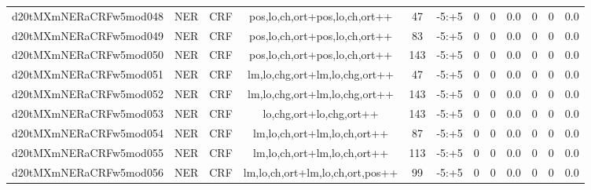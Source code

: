 \documentclass[a4paper]{article}
\begin{document}
\begin{landscape}
\begin{center}
\begin{tabular}{ |c|c|c|c|c|c|c|c|c|c|c|c|}
 
 	
 	\small{ d20tMXmNERaCRFw5mod048 } & \small{ NER} & \small{  CRF }  & pos,lo,ch,ort+pos,lo,ch,ort++  &  47 &  \small{  -5:+5 }  &  0 & 0 & 0.0  &  0 & 0 & 0.0 \\
 	

 
 	
 	\small{ d20tMXmNERaCRFw5mod049 } & \small{ NER} & \small{  CRF }  & pos,lo,ch,ort+pos,lo,ch,ort++  &  83 &  \small{  -5:+5 }  &  0 & 0 & 0.0  &  0 & 0 & 0.0 \\
 	

 
 	
 	\small{ d20tMXmNERaCRFw5mod050 } & \small{ NER} & \small{  CRF }  & pos,lo,ch,ort+pos,lo,ch,ort++  &  143 &  \small{  -5:+5 }  &  0 & 0 & 0.0  &  0 & 0 & 0.0 \\
 	

 
 	
 	\small{ d20tMXmNERaCRFw5mod051 } & \small{ NER} & \small{  CRF }  & lm,lo,chg,ort+lm,lo,chg,ort++  &  47 &  \small{  -5:+5 }  &  0 & 0 & 0.0  &  0 & 0 & 0.0 \\
 	

 
 	
 	\small{ d20tMXmNERaCRFw5mod052 } & \small{ NER} & \small{  CRF }  & lm,lo,chg,ort+lm,lo,chg,ort++  &  143 &  \small{  -5:+5 }  &  0 & 0 & 0.0  &  0 & 0 & 0.0 \\
 	

 
 	
 	\small{ d20tMXmNERaCRFw5mod053 } & \small{ NER} & \small{  CRF }  & lo,chg,ort+lo,chg,ort++  &  143 &  \small{  -5:+5 }  &  0 & 0 & 0.0  &  0 & 0 & 0.0 \\
 	

 
 	
 	\small{ d20tMXmNERaCRFw5mod054 } & \small{ NER} & \small{  CRF }  & lm,lo,ch,ort+lm,lo,ch,ort++  &  87 &  \small{  -5:+5 }  &  0 & 0 & 0.0  &  0 & 0 & 0.0 \\
 	

 
 	
 	\small{ d20tMXmNERaCRFw5mod055 } & \small{ NER} & \small{  CRF }  & lm,lo,ch,ort+lm,lo,ch,ort++  &  113 &  \small{  -5:+5 }  &  0 & 0 & 0.0  &  0 & 0 & 0.0 \\
 	

 
 	
 	\small{ d20tMXmNERaCRFw5mod056 } & \small{ NER} & \small{  CRF }  & lm,lo,ch,ort+lm,lo,ch,ort,pos++  &  99 &  \small{  -5:+5 }  &  0 & 0 & 0.0  &  0 & 0 & 0.0 \\
 	


\end{tabular}
\end{center}
\end{landscape}
\end{document}
